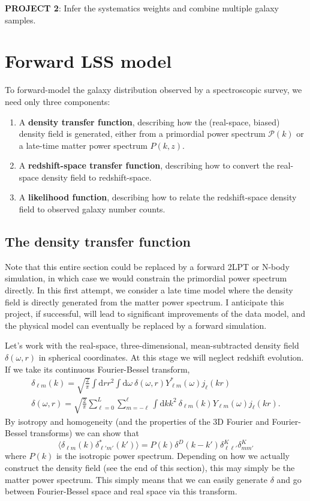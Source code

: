 \documentclass{aastex6}
\renewcommand{\d}{{\mathrm{d}}}
\newcommand{\equ}[1]{\begin{equation}#1\end{equation}}
\newcommand{\eqn}[1]{\begin{eqnarray}#1\end{eqnarray}}
\begin{document}
\textbf{PROJECT 2}: Infer the systematics weights and combine multiple galaxy samples.

\section{Forward LSS model}

To forward-model the galaxy distribution observed by a spectroscopic survey, we need only three components:
\begin{enumerate}
	\item A \textbf{density transfer function}, describing how the (real-space, biased) density field is generated, either from a primordial power spectrum $\mathcal{P}(k)$ or a late-time matter power spectrum $P(k,z)$. 
	\item A \textbf{redshift-space transfer function}, describing how to convert the real-space density field to redshift-space.
	\item A \textbf{likelihood function}, describing how to relate the redshift-space density field to observed galaxy number counts.
\end{enumerate}

\subsection{The density transfer function}

Note that this entire section could be replaced by a forward 2LPT or N-body simulation, in which case we would constrain the primordial power spectrum directly. 
In this first attempt, we consider a late time model where the density field is directly generated from the matter power spectrum.
I anticipate this project, if successful, will lead to significant improvements of the data model, and the physical model can eventually be replaced by a forward simulation.

Let's work with the real-space, three-dimensional, mean-subtracted density field $\delta(\omega, r)$ in spherical coordinates. 
At this stage we will neglect redshift evolution.
If we take its continuous Fourier-Bessel transform,
\eqn{
	\delta_{\ell m}(k) = \sqrt{\frac{2}{\pi}} \int \d r r^2 \int \d \omega \ \delta(\omega, r) Y_{\ell m}^*(\omega) j_\ell(kr)\\
	\delta(\omega, r)  = \sqrt{\frac{2}{\pi}} \sum_{\ell = 0}^L \sum_{m = -\ell}^\ell  \int \d k k^2  \ \delta_{\ell m}(k)Y_{\ell m}(\omega) j_\ell(kr).
}
By isotropy and homogeneity (and the properties of the 3D Fourier and Fourier-Bessel transforms) we can show that
\equ{
	\langle \delta_{\ell m}(k) \delta^*_{\ell' m'}(k') \rangle = P(k) \delta^D(k-k')\delta^K_{\ell \ell'}\delta^K_{mm'}
}
where $P(k)$ is the isotropic power spectrum. Depending on how we actually construct the density field (see the end of this section), this may simply be the matter power spectrum.
This simply means that we can easily generate $\delta$ and go between Fourier-Bessel space and real space via this transform.
\end{document}
